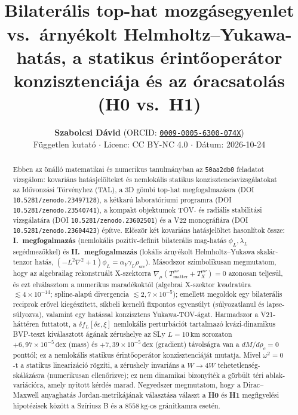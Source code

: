 \documentclass[10pt,a4paper]{article}
\title{\vspace{-10mm}{\bfseries\color{navy}Kovariáns hatásjelöltek és nemlokális statikus konzisztenciavizsgálatok az Idővonzási Törvényhez (\texttt{50aa2db0} feladat)}\\[4pt]
{\normalsize Bilaterális top-hat mozgásegyenlet vs.\ árnyékolt Helmholtz--Yukawa-hatás, a statikus érintőoperátor konzisztenciája és az óracsatolás (H0 vs.\ H1)}}
\author{\textbf{Szabolcsi Dávid} \quad (ORCID: \href{https://orcid.org/0009-0005-6300-074X}{\texttt{0009-0005-6300-074X}})\\
{\small Független kutató $\cdot$ Licenc: CC BY-NC 4.0 $\cdot$ Dátum: 2026-10-24}}
\date{}
\begin{document}
\maketitle
\vspace{-6mm}

\begin{abstract}\noindent
Ebben az önálló matematikai és numerikus tanulmányban az \texttt{50aa2db0} feladatot vizsgálom: kovariáns hatásjelölteket és nemlokális statikus konzisztenciavizsgálatokat az Idővonzási Törvényhez (TAL), a 3D gömbi top-hat megfogalmazásra (DOI \texttt{10.5281/zenodo.23497128}), a kétkarú laboratóriumi programra (DOI \texttt{10.5281/zenodo.23540741}), a kompakt objektumok TOV- és radiális stabilitási vizsgálatára (DOI \texttt{10.5281/zenodo.23602501}) és a V22 monográfiára (DOI \texttt{10.5281/zenodo.23604423}) építve. Először két kovariáns hatásjelöltet hasonlítok össze: \textbf{I.\ megfogalmazás} (nemlokális pozitív-definit bilaterális mag-hatás $\phi_L, \lambda_L$ segédmezőkkel) és \textbf{II.\ megfogalmazás} (lokális árnyékolt Helmholtz--Yukawa skalár-tenzor hatás, $(-L^2\nabla^2+1)\phi_L = \alpha_Y\gamma_L\rho_{\text{src}}$). Másodszor szimbolikusan megmutatom, hogy az algebrailag rekonstruált X-szektorra $\nabla_\mu(T^{\mu\nu}_{\text{matter}} + T^{\mu\nu}_X) = 0$ azonosan teljesül, és ezt elválasztom a numerikus maradékoktól (algebrai X-szektor kvadratúra $\lesssim 4\times 10^{-14}$; spline-alapú divergencia $\lesssim 2{,}7\times 10^{-5}$); emellett megoldok egy bilaterális reciprok erővel kiegészített, síkbeli kernelű fixpontos egyensúlyt (súlyozatlanul és lapse-súlyozva), valamint egy hatással konzisztens Yukawa-TOV-ágat. Harmadszor a V21-háttéren futtatott, a $\delta f_L[\delta\varepsilon, \xi]$ nemlokális perturbációt tartalmazó kvázi-dinamikus BVP-teszt kiválasztott ágának zérushelye az SLy $L=10\,\text{km}$ sorozaton $+6{,}97\times 10^{-5}\,\text{dex}$ (mass) és $+7{,}39\times 10^{-5}\,\text{dex}$ (gradient) távolságra van a $dM/d\rho_c = 0$ ponttól; ez a nemlokális statikus érintőoperátor konzisztenciáját mutatja. Mivel $\omega^2=0$-t a statikus linearizáció rögzíti, a zérushely invariáns a $W\to 4W$ tehetetlenség-skálázásra (numerikusan ellenőrizve); ez nem dinamikai bizonyíték a görbült téri ablak-variációra, amely nyitott kérdés marad. Negyedszer megmutatom, hogy a Dirac--Maxwell anyaghatás Jordan-metrikájának választása választ a \textbf{H0} és \textbf{H1} megfigyelési hipotézisek között a Szíriusz B és a $8558\,\text{kg}$-os gránitkamra esetén.
\end{abstract}
\end{document}
